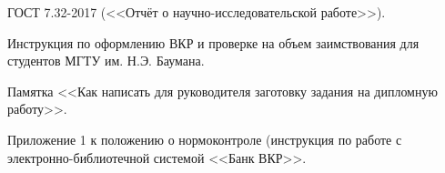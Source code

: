 
ГОСТ 7.32-2017 (<<Отчёт о научно-исследовательской работе>>).





Инструкция по оформлению ВКР и проверке на объем заимствования для студентов МГТУ им. Н.Э. Баумана.





Памятка <<Как написать для руководителя заготовку задания на дипломную работу>>.





Приложение 1 к положению о нормоконтроле (инструкция по работе с электронно-библиотечной системой <<Банк ВКР>>.




